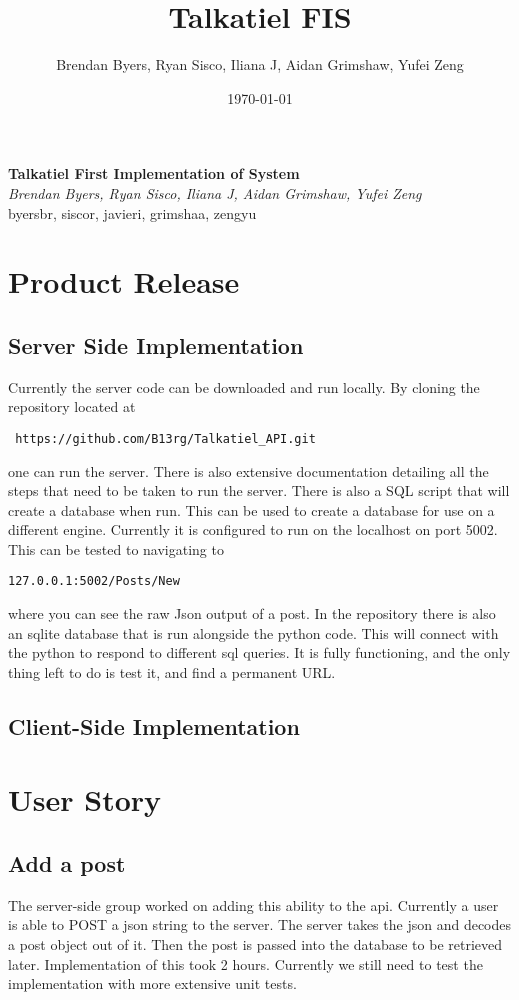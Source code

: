 \documentclass[12pt]{article}
\title{Talkatiel FIS}
\author{Brendan Byers, Ryan Sisco, Iliana J, Aidan Grimshaw, Yufei Zeng}
\date{\today}
\begin{document}
\begin{center}
      \Large\textbf{Talkatiel First Implementation of System}\\
      \large\textit{Brendan Byers, Ryan Sisco, Iliana J, Aidan Grimshaw, Yufei Zeng}\\
      \large{byersbr, siscor, javieri, grimshaa, zengyu}\\
   \end{center}

\tableofcontents
\section{Product Release}
   \subsection{Server Side Implementation}
   Currently the server code can be downloaded and run locally.  By cloning the repository located at\begin{verbatim} https://github.com/B13rg/Talkatiel_API.git \end{verbatim}one can run the server.  There is also extensive documentation detailing all the steps that need to be taken to run the server.  There is also a SQL script that will create a database when run.  This can be used to create a database for use on a different engine.  Currently it is configured to run on the localhost on port 5002.  This can be tested to navigating to \begin{verbatim}127.0.0.1:5002/Posts/New \end{verbatim}where you can see the raw Json output of a post.  In the repository there is also an sqlite database that is run alongside the python code.  This will connect with the python to respond to different sql queries.  It is fully functioning, and the only thing left to do is test it, and find a permanent URL.

   \subsection{Client-Side Implementation}
\section{User Story}
      \subsection{Add a post}
      The server-side group worked on adding this ability to the api.  Currently a user is able to POST a json string to the server.  The server takes the json and decodes a post object out of it.  Then the post is passed into the database to be retrieved later.  Implementation of this took 2 hours.  Currently we still need to test the implementation with more extensive unit tests.
\end{document}
